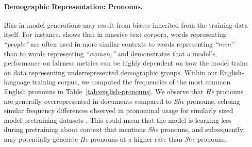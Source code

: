 \paragraph{Demographic Representation: Pronouns.}
Bias in model generations may result from biases inherited from the training data itself. For instance, \citet{bailey2022based} shows that in massive text corpora, words representing \textit{``people''} are often used in more similar contexts to words representing \textit{``men''} than to words representing \textit{``women,''} and \citet{ganesh2023impact} demonstrates that a model's performance on fairness metrics can be highly dependent on how the model trains on data representing underrepresented demographic groups. Within our English-language training corpus, we computed the frequencies of the most common English pronouns in Table~\ref{tab:english-pronouns}.
We observe that \textit{He} pronouns are generally overrepresented in documents compared to \textit{She} pronouns, echoing similar frequency differences observed in pronominal usage for similarly sized model pretraining datasets \citep{palm1}.
This could mean that the model is learning less during pretraining about context that mentions \textit{She} pronouns, and subsequently may potentially generate \textit{He} pronouns at a higher rate than \textit{She} pronouns.

